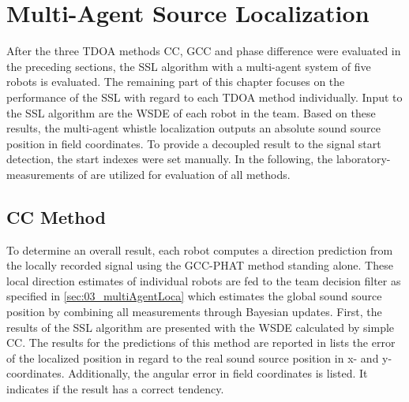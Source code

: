 \section{Multi-Agent Source Localization}
\label{sec:04_multiAgentLoca}

After the three \ac{TDOA} methods \ac{CC}, \ac{GCC} and phase difference were
evaluated in the preceding sections, the \ac{SSL} algorithm with a multi-agent system
of five robots is evaluated.
The remaining part of this chapter focuses on the performance of the \ac{SSL}
with regard to each \ac{TDOA} method individually.
Input to the \ac{SSL} algorithm are the \ac{WSDE} of each
robot in the team. Based on these results, the multi-agent whistle localization outputs
an absolute sound source position in field coordinates.
To provide a decoupled result to the signal start detection,
the start indexes were set manually.
In the following, the laboratory-measurements of 
are utilized for evaluation of all methods.

\subsection{CC Method}
\label{04_teamCc}


To determine an overall result, each robot computes a direction prediction from
the locally recorded signal using the \ac{GCC-PHAT} method standing
alone.
These local direction estimates of individual robots are fed to the team
decision filter as specified in \cref{sec:03_multiAgentLoca} which estimates the
global sound source position by combining all measurements through Bayesian
updates.
First, the results of the \ac{SSL} algorithm are presented with
the \ac{WSDE} calculated by simple \ac{CC}.
The results for the predictions of this method are reported in
 lists the error of the localized position
in regard to the real sound source position in x- and y-coordinates.
Additionally, the angular error in field coordinates is listed.
It indicates if the result has a correct tendency.

